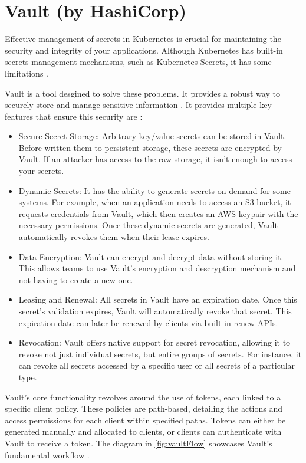 \documentclass[a4paper,11pt,openright,BCOR=15mm]{scrbook}
\begin{document}
\section{Vault (by HashiCorp)}\label{sect:complementMonitor}

Effective management of secrets in Kubernetes is crucial for maintaining the security and integrity of your applications. Although Kubernetes has built-in secrets management mechanisms, such as Kubernetes Secrets, it has some limitations \cite{muppeda_guide_vault_2024}.

Vault is a tool desgined to solve these problems. It provides a robust way to securely store and manage sensitive information \cite{muppeda_guide_vault_2024}. It provides multiple key features that ensure this security are \cite{vault_doc_introduction_nodate}:

\begin{itemize}
	\item Secure Secret Storage: Arbitrary key/value secrets can be stored in Vault. Before written them to persistent storage, these secrets are encrypted by Vault. If an attacker has access to the raw storage, it isn't enough to access your secrets.
	\item Dynamic Secrets: It has the ability to generate secrets on-demand for some systems. For example, when an application needs to access an S3 bucket, it requests credentials from Vault, which then creates an AWS keypair with the necessary permissions. Once these dynamic secrets are generated, Vault automatically revokes them when their lease expires.
	\item Data Encryption: Vault can encrypt and decrypt data without storing it. This allows teams to use Vault's encryption and descryption mechanism and not having to create a new one.
	\item Leasing and Renewal: All secrets in Vault have an expiration date. Once this secret's validation expires, Vault will automatically revoke that secret. This expiration date can later be renewed by clients via built-in renew APIs.
	\item Revocation: Vault offers native support for secret revocation, allowing it to revoke not just individual secrets, but entire groups of secrets. For instance, it can revoke all secrets accessed by a specific user or all secrets of a particular type.
\end{itemize}

Vault's core functionality revolves around the use of tokens, each linked to a specific client policy. These policies are path-based, detailing the actions and access permissions for each client within specified paths. Tokens can either be generated manually and allocated to clients, or clients can authenticate with Vault to receive a token. The diagram in \ref{fig:vaultFlow} showcases Vault's fundamental workflow \cite{vault_doc_introduction_nodate}.
\end{document}
